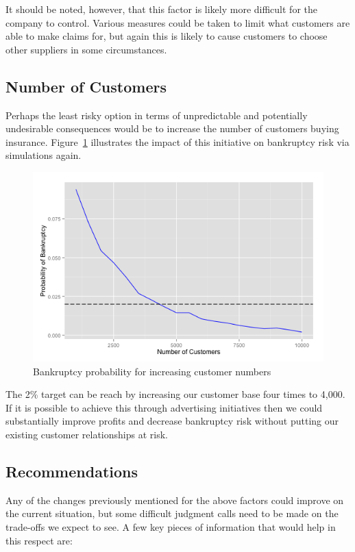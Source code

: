 \documentclass{article}
\begin{document}
It should be noted, however, that this factor is likely more difficult
for the company to control. Various measures could be taken to limit
what customers are able to make claims for, but again this is likely
to cause customers to choose other suppliers in some circumstances.

\subsection*{Number of Customers}

Perhaps the least risky option in terms of unpredictable and
potentially undesirable consequences would be to increase the number
of customers buying insurance. Figure~\ref{fig:q4_customers}
illustrates the impact of this initiative on bankruptcy risk via
simulations again.

\begin{figure}
  \includegraphics[width=\textwidth]{q4_customers}
  \caption{Bankruptcy probability for increasing customer numbers}
  \centering
\label{fig:q4_customers}
\end{figure}

The 2\% target can be reach by increasing our customer base four times
to 4,000. If it is possible to achieve this through advertising
initiatives then we could substantially improve profits and decrease
bankruptcy risk without putting our existing customer relationships at
risk.

\subsection*{Recommendations}

Any of the changes previously mentioned for the above factors could
improve on the current situation, but some difficult judgment calls
need to be made on the trade-offs we expect to see. A few key pieces
of information that would help in this respect are:
\end{document}
